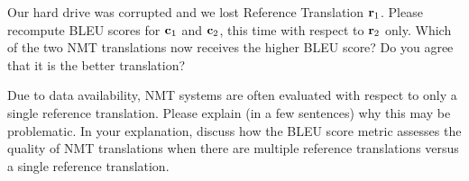 \begin{parts}
\begin{subparts}
        \subpart[5] Our hard drive was corrupted and we lost Reference Translation $\mathbf{r}_1$. Please recompute BLEU scores for $\mathbf{c}_1$ and $\mathbf{c}_2$, this time with respect to $\mathbf{r}_2$ only. Which of the two NMT translations now receives the higher BLEU score? Do you agree that it is the better translation?
        
        
        \subpart[2] Due to data availability, NMT systems are often evaluated with respect to only a single reference translation. Please explain (in a few sentences) why this may be problematic. In your explanation, discuss how the BLEU score metric assesses the quality of NMT translations when there are multiple reference translations versus a single reference translation.
        

\end{subparts}
\end{parts}
